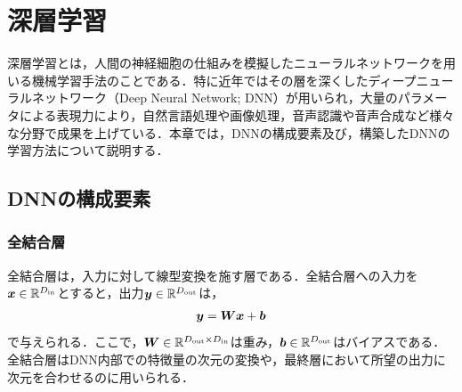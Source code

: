 \section{深層学習}
深層学習とは，人間の神経細胞の仕組みを模擬したニューラルネットワークを用いる機械学習手法のことである．特に近年ではその層を深くしたディープニューラルネットワーク（Deep Neural Network; DNN）が用いられ，大量のパラメータによる表現力により，自然言語処理や画像処理，音声認識や音声合成など様々な分野で成果を上げている．本章では，DNNの構成要素及び，構築したDNNの学習方法について説明する．

\subsection{DNNの構成要素}
\subsubsection{全結合層}
全結合層は，入力に対して線型変換を施す層である．全結合層への入力を$\bm{x} \in \mathbb{R}^{D_{\text{in}}}$とすると，出力$\bm{y} \in \mathbb{R}^{D_{\text{out}}}$は，
\begin{align}
    \bm{y} = \bm{W}\bm{x} + \bm{b}
\end{align}
で与えられる．ここで，$\bm{W} \in \mathbb{R}^{D_{\text{out}} \times D_{\text{in}}}$は重み，$\bm{b} \in \mathbb{R}^{D_{\text{out}}}$はバイアスである．全結合層はDNN内部での特徴量の次元の変換や，最終層において所望の出力に次元を合わせるのに用いられる．

